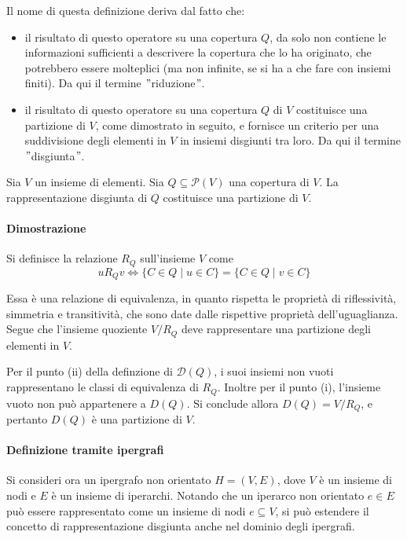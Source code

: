 Il nome di questa definizione deriva dal fatto che:
\begin{itemize}
    \item il risultato di questo operatore su una copertura $Q$, da solo non contiene le informazioni sufficienti a
        descrivere la copertura che lo ha originato, che potrebbero essere molteplici (ma non infinite, se si ha a che
        fare con insiemi finiti). %
        Da qui il termine \("\)riduzione\("\).
    \item il risultato di questo operatore su una copertura $Q$ di $V$ costituisce una partizione di $V$, come
        dimostrato in seguito, e fornisce un criterio per una suddivisione degli elementi in $V$ in insiemi disgiunti
        tra loro.
        Da qui il termine \("\)disgiunta\("\).
\end{itemize}

\begin{proposition}
Sia $V$ un insieme di elementi. Sia $Q \subseteq \mathcal{P}(V)$ una copertura di $V$.
La rappresentazione disgiunta di $Q$ costituisce una partizione di $V$.
\end{proposition}

\paragraph{Dimostrazione}
Si definisce la relazione $R_Q$ sull'insieme $V$ come
\begin{equation*}
    uR_{Q}v \Leftrightarrow \{C \in Q \mid u \in C\} = \{C \in Q \mid v \in C\}
\end{equation*}

Essa \`e una relazione di equivalenza, in quanto rispetta le propriet\`a di riflessivit\`a, simmetria e transitivit\`a,
che sono date dalle rispettive propriet\`a dell'uguaglianza.
Segue che l'insieme quoziente $V/R_{Q}$ deve rappresentare una partizione degli elementi in $V$.

Per il punto (ii) della definzione di $\mathcal{D}(Q)$, i suoi insiemi non vuoti rappresentano le classi di equivalenza
di $R_Q$.
Inoltre per il punto (i), l'insieme vuoto non pu\`o appartenere a $D(Q)$.
Si conclude allora $D(Q) = V/R_{Q}$, e pertanto $D(Q)$ \`e una partizione di $V$.

\paragraph{Definizione tramite ipergrafi} \newline
Si consideri ora un ipergrafo non orientato $H = (V, E)$, dove $V$ \`e un insieme di nodi e $E$ \`e un insieme di
iperarchi.
Notando che un iperarco non orientato $e \in E$ pu\`o essere rappresentato come un insieme di nodi $e \subseteq V$,
si pu\`o estendere il concetto di rappresentazione disgiunta anche nel dominio degli ipergrafi.

